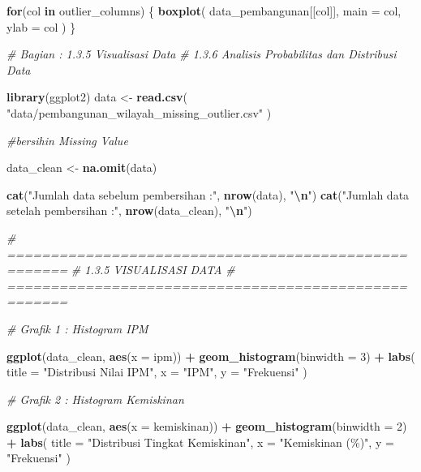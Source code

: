 \documentclass[
  12pt,
]{article}
\newenvironment{Shaded}{\begin{snugshade}}{\end{snugshade}}
\newcommand{\AttributeTok}[1]{\textcolor[rgb]{0.13,0.29,0.53}{#1}}
\newcommand{\CommentTok}[1]{\textcolor[rgb]{0.56,0.35,0.01}{\textit{#1}}}
\newcommand{\ControlFlowTok}[1]{\textcolor[rgb]{0.13,0.29,0.53}{\textbf{#1}}}
\newcommand{\DecValTok}[1]{\textcolor[rgb]{0.00,0.00,0.81}{#1}}
\newcommand{\FunctionTok}[1]{\textcolor[rgb]{0.13,0.29,0.53}{\textbf{#1}}}
\newcommand{\NormalTok}[1]{#1}
\newcommand{\OtherTok}[1]{\textcolor[rgb]{0.56,0.35,0.01}{#1}}
\newcommand{\SpecialCharTok}[1]{\textcolor[rgb]{0.81,0.36,0.00}{\textbf{#1}}}
\newcommand{\StringTok}[1]{\textcolor[rgb]{0.31,0.60,0.02}{#1}}
\begin{document}
\begin{Shaded}
\begin{Highlighting}[]
\ControlFlowTok{for}\NormalTok{(col }\ControlFlowTok{in}\NormalTok{ outlier\_columns) \{}
  \FunctionTok{boxplot}\NormalTok{(}
\NormalTok{    data\_pembangunan[[col]],}
    \AttributeTok{main =}\NormalTok{ col,}
    \AttributeTok{ylab =}\NormalTok{ col}
\NormalTok{  )}
\NormalTok{\}}

\CommentTok{\# Bagian : 1.3.5 Visualisasi Data}
\CommentTok{\#          1.3.6 Analisis Probabilitas dan Distribusi Data}


\FunctionTok{library}\NormalTok{(ggplot2)}
\NormalTok{data }\OtherTok{\textless{}{-}} \FunctionTok{read.csv}\NormalTok{(}
  \StringTok{"data/pembangunan\_wilayah\_missing\_outlier.csv"}
\NormalTok{)}

\CommentTok{\#bersihin Missing Value}

\NormalTok{data\_clean }\OtherTok{\textless{}{-}} \FunctionTok{na.omit}\NormalTok{(data)}

\FunctionTok{cat}\NormalTok{(}\StringTok{"Jumlah data sebelum pembersihan :"}\NormalTok{, }\FunctionTok{nrow}\NormalTok{(data), }\StringTok{"}\SpecialCharTok{\textbackslash{}n}\StringTok{"}\NormalTok{)}
\FunctionTok{cat}\NormalTok{(}\StringTok{"Jumlah data setelah pembersihan :"}\NormalTok{, }\FunctionTok{nrow}\NormalTok{(data\_clean), }\StringTok{"}\SpecialCharTok{\textbackslash{}n}\StringTok{"}\NormalTok{)}

\CommentTok{\# =====================================================}
\CommentTok{\# 1.3.5 VISUALISASI DATA}
\CommentTok{\# =====================================================}

\CommentTok{\# Grafik 1 : Histogram IPM}

\FunctionTok{ggplot}\NormalTok{(data\_clean, }\FunctionTok{aes}\NormalTok{(}\AttributeTok{x =}\NormalTok{ ipm)) }\SpecialCharTok{+}
  \FunctionTok{geom\_histogram}\NormalTok{(}\AttributeTok{binwidth =} \DecValTok{3}\NormalTok{) }\SpecialCharTok{+}
  \FunctionTok{labs}\NormalTok{(}
    \AttributeTok{title =} \StringTok{"Distribusi Nilai IPM"}\NormalTok{,}
    \AttributeTok{x =} \StringTok{"IPM"}\NormalTok{,}
    \AttributeTok{y =} \StringTok{"Frekuensi"}
\NormalTok{  )}

\CommentTok{\# Grafik 2 : Histogram Kemiskinan}

\FunctionTok{ggplot}\NormalTok{(data\_clean, }\FunctionTok{aes}\NormalTok{(}\AttributeTok{x =}\NormalTok{ kemiskinan)) }\SpecialCharTok{+}
  \FunctionTok{geom\_histogram}\NormalTok{(}\AttributeTok{binwidth =} \DecValTok{2}\NormalTok{) }\SpecialCharTok{+}
  \FunctionTok{labs}\NormalTok{(}
    \AttributeTok{title =} \StringTok{"Distribusi Tingkat Kemiskinan"}\NormalTok{,}
    \AttributeTok{x =} \StringTok{"Kemiskinan (\%)"}\NormalTok{,}
    \AttributeTok{y =} \StringTok{"Frekuensi"}
\NormalTok{  )}


\end{Highlighting}
\end{Shaded}
\end{document}
